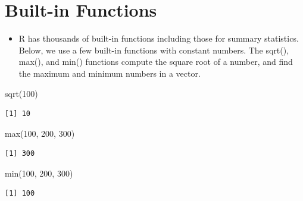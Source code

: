 \documentclass[
  letterpaper,
  DIV=11,
  numbers=noendperiod]{scrreprt}
\newenvironment{Shaded}{\begin{snugshade}}{\end{snugshade}}
\newcommand{\DecValTok}[1]{\textcolor[rgb]{0.68,0.00,0.00}{#1}}
\newcommand{\FunctionTok}[1]{\textcolor[rgb]{0.28,0.35,0.67}{#1}}
\newcommand{\NormalTok}[1]{\textcolor[rgb]{0.00,0.23,0.31}{#1}}
\providecommand{\tightlist}{%
  \setlength{\itemsep}{0pt}\setlength{\parskip}{0pt}}\usepackage{longtable,booktabs,array}
\begin{document}
\section{Built-in Functions}\label{built-in-functions}

\begin{itemize}
\tightlist
\item
  R has thousands of built-in functions including those for summary
  statistics. Below, we use a few built-in functions with constant
  numbers. The sqrt(), max(), and min() functions compute the square
  root of a number, and find the maximum and minimum numbers in a
  vector.
\end{itemize}

\begin{Shaded}
\begin{Highlighting}[]
\FunctionTok{sqrt}\NormalTok{(}\DecValTok{100}\NormalTok{)}
\end{Highlighting}
\end{Shaded}

\begin{verbatim}
[1] 10
\end{verbatim}

\begin{Shaded}
\begin{Highlighting}[]
\FunctionTok{max}\NormalTok{(}\DecValTok{100}\NormalTok{, }\DecValTok{200}\NormalTok{, }\DecValTok{300}\NormalTok{)}
\end{Highlighting}
\end{Shaded}

\begin{verbatim}
[1] 300
\end{verbatim}

\begin{Shaded}
\begin{Highlighting}[]
\FunctionTok{min}\NormalTok{(}\DecValTok{100}\NormalTok{, }\DecValTok{200}\NormalTok{, }\DecValTok{300}\NormalTok{)}
\end{Highlighting}
\end{Shaded}

\begin{verbatim}
[1] 100
\end{verbatim}
\end{document}
